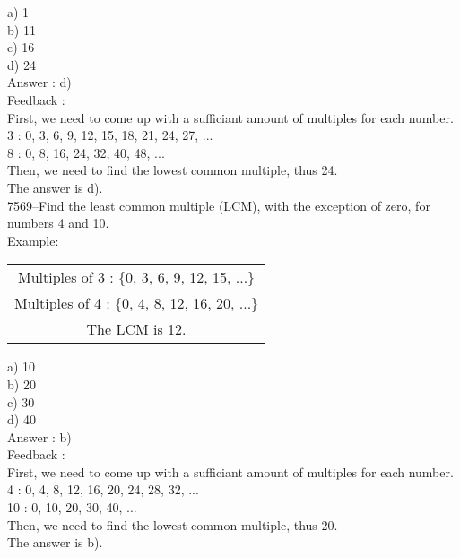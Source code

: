 \documentclass[letterpaper, 12pt]{article}
\begin{document}
a) 1\\
b) 11\\
c) 16\\
d) 24\\

Answer : d)\\

Feedback :\\
First, we need to come up with a sufficiant amount of multiples for each number.\\
3 : 0, 3, 6, 9, 12, 15, 18, 21, 24, 27, ...\\
8 : 0, 8, 16, 24, 32, 40, 48, ...\\

Then, we need to find the lowest common multiple, thus 24.\\
The answer is d).\\




7569--Find the least common multiple (LCM), with the exception of zero, for numbers 4 and 10.\\
Example:\\
\begin{center}
\begin{tabular}{|c|}
\hline
Multiples of 3 : \{0, 3, 6, 9, 12, 15, ...\}\\
Multiples of 4 : \{0, 4, 8, 12, 16, 20, ...\}\\
The LCM is 12.\\
\hline
\end{tabular}
\end{center}

a) 10\\
b) 20\\
c) 30\\
d) 40\\

Answer : b)\\

Feedback :\\
First, we need to come up with a sufficiant amount of multiples for each number.\\
4 : 0, 4, 8, 12, 16, 20, 24, 28, 32, ...\\
10 : 0, 10, 20, 30, 40, ...\\

Then, we need to find the lowest common multiple, thus 20.\\
The answer is b).\\
\end{document}
